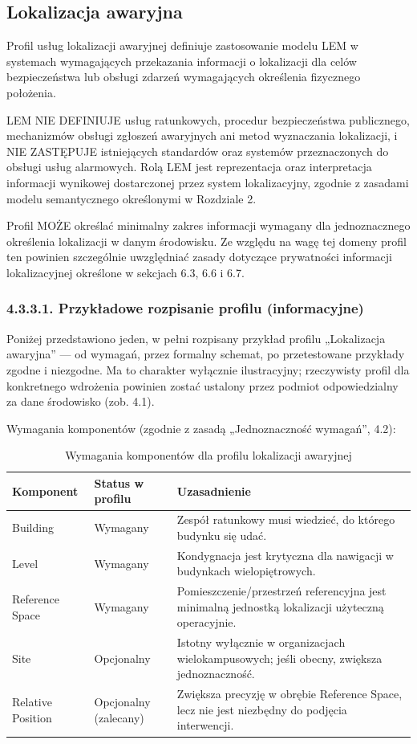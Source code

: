 \subsection{Lokalizacja awaryjna}
Profil usług lokalizacji awaryjnej definiuje zastosowanie modelu LEM w systemach wymagających przekazania informacji o lokalizacji dla celów bezpieczeństwa lub obsługi zdarzeń wymagających określenia fizycznego położenia.

LEM NIE DEFINIUJE usług ratunkowych, procedur bezpieczeństwa publicznego, mechanizmów obsługi zgłoszeń awaryjnych ani metod wyznaczania lokalizacji, i NIE ZASTĘPUJE istniejących standardów oraz systemów przeznaczonych do obsługi usług alarmowych. Rolą LEM jest reprezentacja oraz interpretacja informacji wynikowej dostarczonej przez system lokalizacyjny, zgodnie z zasadami modelu semantycznego określonymi w Rozdziale 2.

Profil MOŻE określać minimalny zakres informacji wymagany dla jednoznacznego określenia lokalizacji w danym środowisku. Ze względu na wagę tej domeny profil ten powinien szczególnie uwzględniać zasady dotyczące prywatności informacji lokalizacyjnej określone w sekcjach 6.3, 6.6 i 6.7.

\subsubsection{4.3.3.1. Przykładowe rozpisanie profilu (informacyjne)}
Poniżej przedstawiono jeden, w pełni rozpisany przykład profilu „Lokalizacja awaryjna” — od wymagań, przez formalny schemat, po przetestowane przykłady zgodne i niezgodne. Ma to charakter wyłącznie ilustracyjny; rzeczywisty profil dla konkretnego wdrożenia powinien zostać ustalony przez podmiot odpowiedzialny za dane środowisko (zob. 4.1).

Wymagania komponentów (zgodnie z zasadą „Jednoznaczność wymagań”, 4.2):

\begin{table}[htbp]
\centering
\begin{tabular}{|l|l|p{7cm}|}
\hline
\textbf{Komponent} & \textbf{Status w profilu} & \textbf{Uzasadnienie} \\ \hline
Building & Wymagany & Zespół ratunkowy musi wiedzieć, do którego budynku się udać. \\ \hline
Level & Wymagany & Kondygnacja jest krytyczna dla nawigacji w budynkach wielopiętrowych. \\ \hline
Reference Space & Wymagany & Pomieszczenie/przestrzeń referencyjna jest minimalną jednostką lokalizacji użyteczną operacyjnie. \\ \hline
Site & Opcjonalny & Istotny wyłącznie w organizacjach wielokampusowych; jeśli obecny, zwiększa jednoznaczność. \\ \hline
Relative Position & Opcjonalny (zalecany) & Zwiększa precyzję w obrębie Reference Space, lecz nie jest niezbędny do podjęcia interwencji. \\ \hline
\end{tabular}
\caption{Wymagania komponentów dla profilu lokalizacji awaryjnej}
\label{tab:emergency_profile}
\end{table}


